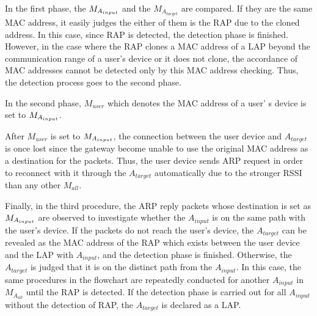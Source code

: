 \documentclass[conference]{IEEEtran}
\newcommand{\tarMAC}{M_{A_{target}}}
\newcommand{\userMAC}{M_{user}}
\newcommand{\inputAP}{A_{input}}
\newcommand{\tarAP}{A_{target}}
\begin{document}
In the first phase, the $M_{A_{input}}$ and the $\tarMAC$ are compared.
If they are the same MAC address, it easily judges the either of them is the RAP due to the cloned address.
In this case, since RAP is detected, the detection phase is finished.
However, in the case where the RAP clones a MAC address of a LAP beyond the communication range of a user's device or it does not clone, the accordance of MAC addresses cannot be detected only by this MAC address checking.
Thus, the detection process goes to the second phase.

In the second phase, $\userMAC$ which denotes the MAC address of a user' s device is set to $M_{A_{input}}$.

After $\userMAC$ is set to $M_{A_{input}}$, the connection between the user device and $\tarAP$ is once lost since the gateway become unable to use the original MAC address as a destination for the packets.
Thus, the user device sends ARP request in order to reconnect with it through the $\tarAP$ automatically due to the stronger RSSI than any other $M_{all}$.

Finally, in the third procedure, the ARP reply packets whose destination is set as $M_{A_{input}}$ are observed to investigate whether the $\inputAP$ is on the same path with the user's device.
If the packets do not reach the user's device, the $\tarAP$ can be revealed as the MAC address of the RAP which exists between the user device and the LAP with  $\inputAP$, and the detection phase is finished.
Otherwise, the $\tarAP$ is judged that it is on the distinct path from the $\inputAP$.
In this case, the same procedures in the flowchart are repeatedly conducted for another $\inputAP$ in $M_{A_{all}}$ until the RAP is detected.
If the detection phase is carried out for all $\inputAP$ without the detection of RAP, the $\tarAP$ is declared as a LAP. 
\end{document}
